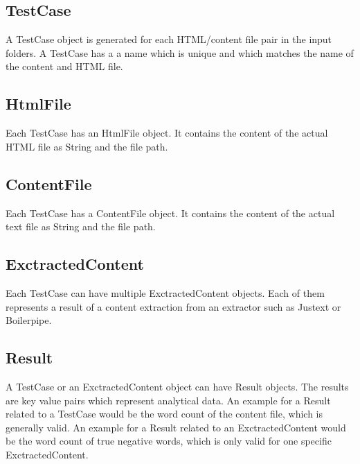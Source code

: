 \subsection{TestCase}
A TestCase object is generated for each HTML/content file pair in the input folders. A TestCase has a a name which is unique and which matches the name of the content and HTML file.

\subsection{HtmlFile}
Each TestCase has an HtmlFile object. It contains the content of the actual HTML file as String and the file path.

\subsection{ContentFile}
Each TestCase has a ContentFile object. It contains the content of the actual text file as String and the file path.

\subsection{ExctractedContent}
Each TestCase can have multiple ExctractedContent objects. Each of them represents a result of a content extraction from an extractor such as Justext or Boilerpipe.

\subsection{Result}
A TestCase or an ExctractedContent object can have Result objects. The results are key value pairs which represent analytical data. An example for a Result related to a TestCase would be the word count of the content file, which is generally valid. An example for a Result related to an ExctractedContent would be the word count of true negative words, which is only valid for one specific ExctractedContent.


